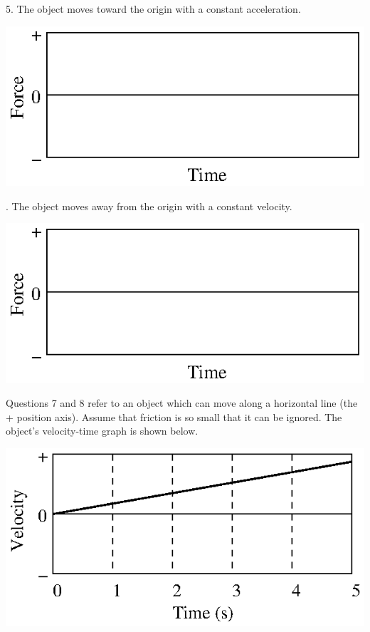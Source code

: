 5. The object moves toward the origin with a constant acceleration.

\vspace{0.3cm}
{\par\centering \includegraphics[scale=1.1]{force1/force1_fig10.eps} \par}
\vspace{0.3cm}

. The object moves away from the origin with a constant velocity.

\vspace{0.3cm}
{\par\centering \includegraphics[scale=1.1]{force1/force1_fig10.eps} \par}
\answerspace{0.3cm}

Questions 7 and 8 refer to an object which can move along a horizontal line
(the + position axis). Assume that friction is so small that it can be ignored.
The object's velocity-time graph is shown below.

\vspace{0.3cm}
{\par\centering \includegraphics[scale=1.1]{force1/force1_fig11.eps} \par}
\answerspace{0.3cm}

